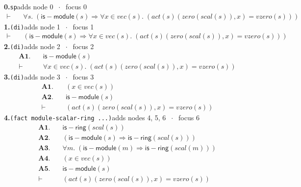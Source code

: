\documentclass[11pt]{article}
\begin{document}
\medskip\noindent\textbf{0.}\quad \texttt{sp}\hfill{\small adds node 0 $\;\cdot\;$ focus 0}\\[2pt]
\begin{align*}
  \vdash\quad & \forall s.\; (\mathsf{is{-}module}(s) \Rightarrow \forall x \in \mathit{vec}(s).\; (\mathit{act}(s)(\mathit{zero}(\mathit{scal}(s)), x) = \mathit{vzero}(s)))
\end{align*}
\medskip\noindent\textbf{1.}\quad \texttt{(di)}\hfill{\small adds node 1 $\;\cdot\;$ focus 1}\\[2pt]
\begin{align*}
  \vdash\quad & (\mathsf{is{-}module}(s) \Rightarrow \forall x \in \mathit{vec}(s).\; (\mathit{act}(s)(\mathit{zero}(\mathit{scal}(s)), x) = \mathit{vzero}(s)))
\end{align*}
\medskip\noindent\textbf{2.}\quad \texttt{(di)}\hfill{\small adds node 2 $\;\cdot\;$ focus 2}\\[2pt]
\begin{align*}
  \mathbf{A1.}\quad & \mathsf{is{-}module}(s) \\
  \vdash\quad & \forall x \in \mathit{vec}(s).\; (\mathit{act}(s)(\mathit{zero}(\mathit{scal}(s)), x) = \mathit{vzero}(s))
\end{align*}
\medskip\noindent\textbf{3.}\quad \texttt{(di)}\hfill{\small adds node 3 $\;\cdot\;$ focus 3}\\[2pt]
\begin{align*}
  \mathbf{A1.}\quad & (x \in \mathit{vec}(s)) \\
  \mathbf{A2.}\quad & \mathsf{is{-}module}(s) \\
  \vdash\quad & (\mathit{act}(s)(\mathit{zero}(\mathit{scal}(s)), x) = \mathit{vzero}(s))
\end{align*}
\medskip\noindent\textbf{4.}\quad \texttt{(fact module-scalar-ring ...)}\hfill{\small adds nodes 4, 5, 6 $\;\cdot\;$ focus 6}\\[2pt]
\begin{align*}
  \mathbf{A1.}\quad & \mathsf{is{-}ring}(\mathit{scal}(s)) \\
  \mathbf{A2.}\quad & (\mathsf{is{-}module}(s) \Rightarrow \mathsf{is{-}ring}(\mathit{scal}(s))) \\
  \mathbf{A3.}\quad & \forall m.\; (\mathsf{is{-}module}(m) \Rightarrow \mathsf{is{-}ring}(\mathit{scal}(m))) \\
  \mathbf{A4.}\quad & (x \in \mathit{vec}(s)) \\
  \mathbf{A5.}\quad & \mathsf{is{-}module}(s) \\
  \vdash\quad & (\mathit{act}(s)(\mathit{zero}(\mathit{scal}(s)), x) = \mathit{vzero}(s))
\end{align*}
\end{document}
